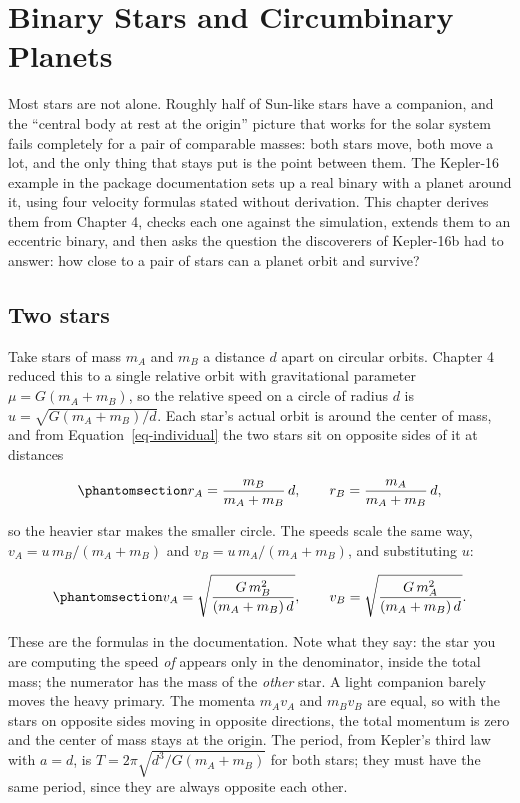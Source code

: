 \documentclass[
  10.5pt,
  letterpaper,
]{scrbook}
\theoremstyle{definition}
\theoremstyle{plain}
\theoremstyle{remark}
\begin{document}
\chapter{Binary Stars and Circumbinary Planets}\label{sec-binary-stars}

Most stars are not alone. Roughly half of Sun-like stars have a
companion, and the ``central body at rest at the origin'' picture that
works for the solar system fails completely for a pair of comparable
masses: both stars move, both move a lot, and the only thing that stays
put is the point between them. The Kepler-16 example in the package
documentation sets up a real binary with a planet around it, using four
velocity formulas stated without derivation. This chapter derives them
from Chapter 4, checks each one against the simulation, extends them to
an eccentric binary, and then asks the question the discoverers of
Kepler-16b had to answer: how close to a pair of stars can a planet
orbit and survive?

\section{Two stars}\label{two-stars}

Take stars of mass \(m_A\) and \(m_B\) a distance \(d\) apart on
circular orbits. Chapter 4 reduced this to a single relative orbit with
gravitational parameter \(\mu = G(m_A + m_B)\), so the relative speed on
a circle of radius \(d\) is \(u = \sqrt{G(m_A+m_B)/d}\). Each star's
actual orbit is around the center of mass, and from
Equation~\ref{eq-individual} the two stars sit on opposite sides of it
at distances

\begin{equation}\protect\phantomsection\label{eq-binary-radii}{
r_A = \frac{m_B}{m_A + m_B}\,d, \qquad r_B = \frac{m_A}{m_A + m_B}\,d,
}\end{equation}

so the heavier star makes the smaller circle. The speeds scale the same
way, \(v_A = u\,m_B/(m_A+m_B)\) and \(v_B = u\,m_A/(m_A+m_B)\), and
substituting \(u\):

\begin{equation}\protect\phantomsection\label{eq-binary-speeds}{
v_A = \sqrt{\frac{G\,m_B^2}{(m_A + m_B)\,d}}, \qquad
v_B = \sqrt{\frac{G\,m_A^2}{(m_A + m_B)\,d}}.
}\end{equation}

These are the formulas in the documentation. Note what they say: the
star you are computing the speed \emph{of} appears only in the
denominator, inside the total mass; the numerator has the mass of the
\emph{other} star. A light companion barely moves the heavy primary. The
momenta \(m_A v_A\) and \(m_B v_B\) are equal, so with the stars on
opposite sides moving in opposite directions, the total momentum is zero
and the center of mass stays at the origin. The period, from Kepler's
third law with \(a = d\), is \(T = 2\pi\sqrt{d^3/G(m_A+m_B)}\) for both
stars; they must have the same period, since they are always opposite
each other.
\end{document}
